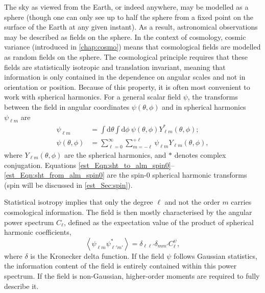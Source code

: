 The sky as viewed from the Earth, or indeed anywhere, may be modelled as a sphere (though one can only see up to half the sphere from a fixed point on the surface of the Earth at any given instant). As a result, astronomical observations may be described as fields on the sphere. In the context of cosmology, cosmic variance (introduced in \autoref{chap:cosmo}) means that cosmological fields are modelled as random fields on the sphere. The cosmological principle requires that these fields are statistically isotropic and translation invariant, meaning that information is only contained in the dependence on angular scales and not in orientation or position. Because of this property, it is often most convenient to work with spherical harmonics. For a general scalar field $\psi$, the transforms between the field in angular coordinates $\psi \left( \theta, \phi \right)$ and in spherical harmonics $\psi_{\ell m}$ are
\begin{align}
\psi_{\ell m} &= \int{\text{d}\theta \int{\text{d}\phi ~
\psi \left( \theta, \phi \right) Y_{\ell m}^* \left( \theta, \phi \right) } };
\label{est_Eqn:sht_to_alm_spin0}
\\[1em]
\psi \left( \theta, \phi \right) &= \sum_{\ell = 0}^\infty
\sum_{m = - \ell}^{+\ell} \psi_{\ell m}
Y_{\ell m} \left( \theta, \phi \right),
\label{est_Eqn:sht_from_alm_spin0}
\end{align}
where $Y_{\ell m} \left( \theta, \phi \right)$ are the spherical harmonics, and $*$ denotes complex conjugation. Equations \eqref{est_Eqn:sht_to_alm_spin0}--\eqref{est_Eqn:sht_from_alm_spin0} are the spin-0 spherical harmonic transforms (spin will be discussed in \autoref{est_Sec:spin}).

Statistical isotropy implies that only the degree $\ell$ and not the order $m$ carries cosmological information. The field is then mostly characterised by the angular power spectrum $C_\ell$, defined as the expectation value of the product of spherical harmonic coefficients,
\begin{equation}
\left\langle \psi_{\ell m} \psi^*_{\ell' m'} \right\rangle
= \delta_{\ell \ell'} \delta_{m m'} C_\ell^\psi,
\end{equation}
where $\delta$ is the Kronecker delta function.
If the field $\psi$ follows Gaussian statistics, the information content of the field is entirely contained within this power spectrum. If the field is non-Gaussian, higher-order moments are required to fully describe it.

